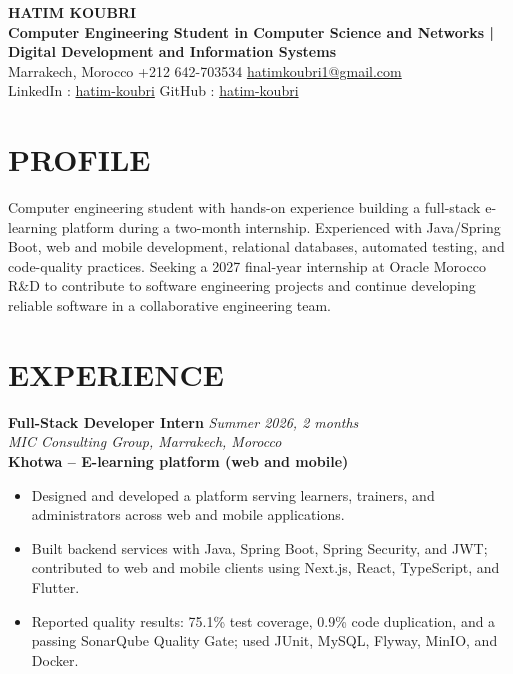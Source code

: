 \documentclass[a4paper,11pt]{article}
\begin{document}
\fontsize{11}{13.6}\selectfont

\begin{center}
  {\LARGE\bfseries HATIM KOUBRI}\\[-0.1em]
  {\normalsize\bfseries Computer Engineering Student in Computer Science and Networks | Digital Development and Information Systems}\\[0.25em]
  Marrakech, Morocco \textbar{} +212 642-703534 \textbar{} \href{mailto:hatimkoubri1@gmail.com}{hatimkoubri1@gmail.com}\\[0.1em]
  LinkedIn : \href{https://linkedin.com/in/hatim-koubri}{hatim-koubri} \textbar{}
  GitHub : \href{https://github.com/hatim-koubri}{hatim-koubri}
\end{center}
\vspace{-0.1em}

\section{PROFILE}
Computer engineering student with hands-on experience building a full-stack e-learning platform during a two-month internship. Experienced with Java/Spring Boot, web and mobile development, relational databases, automated testing, and code-quality practices. Seeking a 2027 final-year internship at Oracle Morocco R\&D to contribute to software engineering projects and continue developing reliable software in a collaborative engineering team.

\section{EXPERIENCE}
\textbf{Full-Stack Developer Intern} \hfill \textit{Summer 2026, 2 months}\\
\textit{MIC Consulting Group, Marrakech, Morocco}\\[-0.15em]
\textbf{Khotwa -- E-learning platform (web and mobile)}
\begin{itemize}
  \item Designed and developed a platform serving learners, trainers, and administrators across web and mobile applications.
  \item Built backend services with Java, Spring Boot, Spring Security, and JWT; contributed to web and mobile clients using Next.js, React, TypeScript, and Flutter.
  \item Reported quality results: 75.1\% test coverage, 0.9\% code duplication, and a passing SonarQube Quality Gate; used JUnit, MySQL, Flyway, MinIO, and Docker.
\end{itemize}
\end{document}
